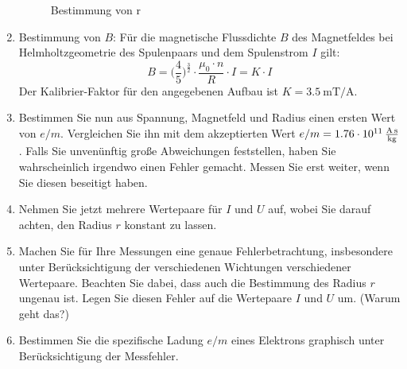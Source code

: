 \begin{enumerate}
\begin{figure}[!h]
		\caption{Bestimmung von r}
		\label{fig:Abb6}
	\end{figure}
	\item Bestimmung von $B$: Für die magnetische Flussdichte $B$ des Magnetfeldes bei Helmholtzgeometrie des Spulenpaars und dem Spulenstrom $I$ gilt:
	\begin{equation}
		B=\Big(\frac{4}{5}\Big)^\frac{3}{2}\cdot\frac{\mu_0\cdot n}{R}\cdot I=K\cdot I
	\end{equation}
	Der Kalibrier-Faktor für den angegebenen Aufbau ist $K=\SI{3,5}{\milli\tesla\per\ampere}$.
	\item Bestimmen Sie nun aus Spannung, Magnetfeld und Radius einen ersten Wert von $e/m$. Vergleichen Sie ihn mit dem akzeptierten Wert $e/m=\SI{1.76E11}{\ampere\second\per\kilogram}$. Falls Sie unvenünftig große Abweichungen feststellen, haben Sie wahrscheinlich irgendwo einen Fehler gemacht. Messen Sie erst weiter, wenn Sie diesen beseitigt haben.
	\item Nehmen Sie jetzt mehrere Wertepaare für $I$ und $U$ auf, wobei Sie darauf achten, den Radius $r$ konstant zu lassen.
	\item Machen Sie für Ihre Messungen eine genaue Fehlerbetrachtung, insbesondere unter Berücksichtigung der verschiedenen Wichtungen verschiedener Wertepaare. Beachten Sie dabei, dass auch die Bestimmung des Radius $r$ ungenau ist. Legen Sie diesen Fehler auf die Wertepaare $I$ und $U$ um. (Warum geht das?)
	\item Bestimmen Sie die spezifische Ladung $e/m$ eines Elektrons graphisch unter Berücksichtigung der Messfehler.
\end{enumerate}
